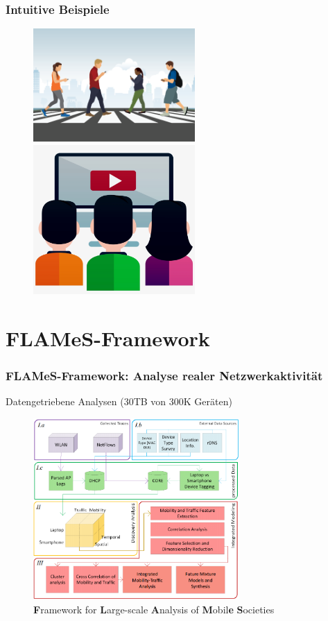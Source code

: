 \documentclass{beamer}
\begin{document}
\begin{frame}
  \frametitle{Intuitive Beispiele}
  \begin{figure}
    \centering
    \includegraphics[width=0.55\textwidth]{images/smartphone_walking.png}
    \includegraphics[width=0.55\textwidth]{images/watching_tv.jpeg}
  \end{figure}
\end{frame}

\section{FLAMeS-Framework}

\begin{frame}
\frametitle{FLAMeS-Framework: Analyse realer Netzwerkaktivität}
  \centering
  Datengetriebene Analysen ($30$\textsc{TB} von $300$\textsc{K} Geräten)
  \begin{figure}
    \centering
    \includegraphics[width=0.7\textwidth]{images/FLAMeS.png}
    \caption*{\textbf{F}ramework for \textbf{L}arge-scale \textbf{A}nalysis of \textbf{M}obil\textbf{e} \textbf{S}ocieties}
  \end{figure}  
\end{frame}
\end{document}
